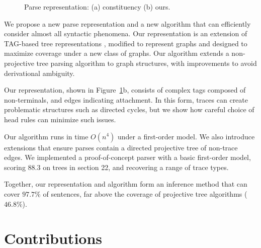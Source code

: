 \begin{figure}
  \centering
  \scalebox{0.65}{
  
  }
  \vspace{-5mm}
  \caption{\label{fig:repr}
    Parse representation: (a) constituency (b) ours.
  }
\end{figure}

We propose a new parse representation and a new algorithm that can efficiently consider almost all syntactic phenomena.
Our representation is an extension of TAG-based tree representations \parencite{cck,Shen:2007}, modified to represent graphs and designed to maximize coverage under a new class of graphs.
Our algorithm extends a non-projective tree parsing algorithm \parencite{ec} to graph structures, with improvements to avoid derivational ambiguity.

Our representation, shown in Figure~\ref{fig:repr}b, consists of complex tags composed of non-terminals, and edges indicating attachment.
In this form, traces can create problematic structures such as directed cycles, but we show how careful choice of head rules can minimize such issues.

Our algorithm runs in time $O(n^4)$ under a first-order model.
We also introduce extensions that ensure parses contain a directed projective tree of non-trace edges.
We implemented a proof-of-concept parser with a basic first-order model, scoring $88.3$ on trees in section 22, and recovering a range of trace types.

Together, our representation and algorithm form an inference method that can cover $97.7\%$ of sentences, far above the coverage of projective tree algorithms ($46.8\%$).

\section{Contributions}

